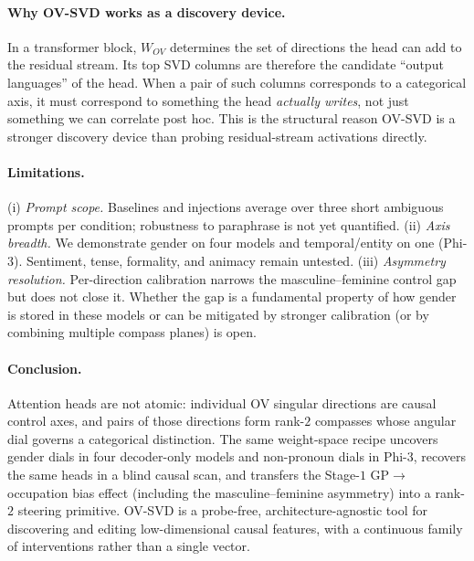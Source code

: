 \paragraph{Why OV-SVD works as a discovery device.} In a
transformer block, $W_{OV}$ determines the set of directions the
head can add to the residual stream. Its top SVD columns are
therefore the candidate ``output languages'' of the head. When a
pair of such columns corresponds to a categorical axis, it must
correspond to something the head \emph{actually writes}, not just
something we can correlate post hoc. This is the structural reason
OV-SVD is a stronger discovery device than probing residual-stream
activations directly.

\paragraph{Limitations.}
(i) \emph{Prompt scope.} Baselines and injections average over
three short ambiguous prompts per condition; robustness to
paraphrase is not yet quantified.
(ii) \emph{Axis breadth.} We demonstrate gender on four models
and temporal/entity on one (Phi-3). Sentiment, tense, formality,
and animacy remain untested.
(iii) \emph{Asymmetry resolution.} Per-direction calibration
narrows the masculine--feminine control gap but does not close it.
Whether the gap is a fundamental property of how gender is stored
in these models or can be mitigated by stronger calibration (or by
combining multiple compass planes) is open.

\paragraph{Conclusion.} Attention heads are not atomic: individual
OV singular directions are causal control axes, and pairs of those
directions form rank-$2$ compasses whose angular dial governs a
categorical distinction. The same weight-space recipe uncovers
gender dials in four decoder-only models and non-pronoun dials in
Phi-3, recovers the same heads in a blind causal scan, and
transfers the Stage-$1$ GP$\to$occupation bias effect (including
the masculine--feminine asymmetry) into a rank-$2$ steering
primitive. OV-SVD is a probe-free, architecture-agnostic tool for
discovering and editing low-dimensional causal features, with a
continuous family of interventions rather than a single vector.
